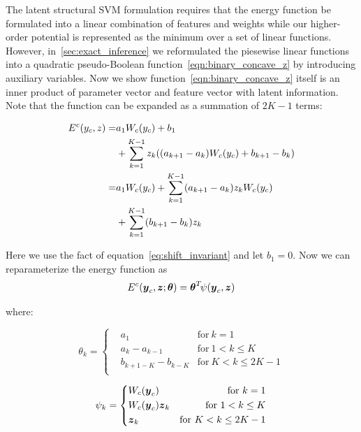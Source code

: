 \documentclass[sigconf,anonymous,review]{acmart}
\begin{document}
The latent structural SVM formulation requires that the energy
function be formulated into a linear combination of features and
weights while our higher-order potential is represented as the
minimum over a set of linear functions. However,
in~\ref{sec:exact_inference} we reformulated the piesewise linear
functions into a quadratic pseudo-Boolean
function~\eqref{eqn:binary_concave_z} by introducing auxiliary
variables. Now we show function~\eqref{eqn:binary_concave_z}
itself is an inner product of parameter vector and feature vector
with latent information. Note that the function can be expanded
as a summation of $2K-1$ terms:

\begin{align}
  \label{eq:originalenergy}
  E^c(y_c,z)=&a_1W_c(y_c)+b_1\notag \\
            &+\sum_{k=1}^{K-1}z_k((a_{k+1}-a_k)W_c(y_c)+b_{k+1}-b_k)\notag \\ 
            =&a_1W_c(y_c)+\sum_{k=1}^{K-1}(a_{k+1}-a_k)z_kW_c(y_c) \notag \\
            &+\sum_{k=1}^{K-1}(b_{k+1}-b_k)z_k
\end{align}

Here we use the fact of equation~\eqref{eq:shift_invariant} and
let $b_1=0$. Now we can reparameterize the energy function
as
\begin{align}
  \label{eq:llsvm_innerprod_energy}
  E^c({\boldsymbol{y}}_c,{\boldsymbol{z}}; \boldsymbol{\theta}) = \boldsymbol{\theta}^T \! \psi({\boldsymbol{y}}_c,{\boldsymbol{z}})
\end{align}

\noindent where:

\begin{equation}
\label{eq:llsvm_param}
  \theta_k = \left\{
    \begin{aligned}
      & a_1	& \text{for} \ k=1\\
      & a_k-a_{k-1} & \text{for}\ 1< k \leq K\\
      & b_{k+1-K}-b_{k-K} & \text{for} \ K<k\le2K-1\\
    \end{aligned}
  \right.
\end{equation}

\begin{equation}
\label{eq:llsvm_feature}
  \psi_k = \left\{
		\begin{aligned}
      & W_c({\boldsymbol{y}}_c) 	& \text{for} \ k=1\\
      & W_c({\boldsymbol{y}}_c){\boldsymbol{z}}_k & \text{for}\ 1<k\le K\\
      & {\boldsymbol{z}}_k & \text{for} \ K<k\le2K-1\\
		\end{aligned}
  \right.
\end{equation}
\end{document}
